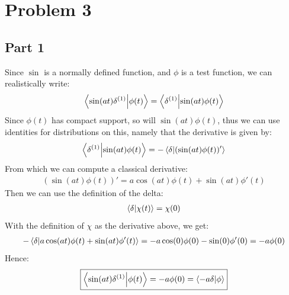 \documentclass[12pt]{article}
\begin{document}
\section*{Problem 3}
\subsection*{Part 1}
Since $\sin$ is a normally defined function, and $\phi$ is a test function, we can realistically write:
\begin{align*}
  \ip{\sin(at)\delta^{(1)}}{\phi(t)}=\ip{\delta^{(1)}}{\sin(at)\phi(t)}
\end{align*}
Since $\phi(t)$ has compact support, so will $\sin(at)\phi(t)$, thus we can use identities for distributions on this, namely that the derivative is given by:
\begin{align*}
  \ip{\delta^{(1)}}{\sin(at)\phi(t)}=-\ip{\delta}{(\sin(at)\phi(t))'}
\end{align*}
From which we can compute a classical derivative:
\begin{align*}
  (\sin(at)\phi(t))'=a\cos(at)\phi(t)+\sin(at)\phi'(t)
\end{align*}
Then we can use the definition of the delta:
\begin{align*}
  \ip{\delta}{\chi(t)}=\chi(0)
\end{align*}
With the definition of $\chi$ as the derivative above, we get:
\begin{align*}
  -\ip{\delta}{a\cos(at)\phi(t)+\sin(at)\phi'(t)}=
  -a\cos(0)\phi(0)-\sin(0)\phi'(0)=-a\phi(0)
\end{align*}
Hence:
\begin{align}
  \boxed{
    \ip{\sin(at)\delta^{(1)}}{\phi(t)}=-a\phi(0)=\ip{-a\delta}{\phi}
  }
\end{align}
\end{document}
